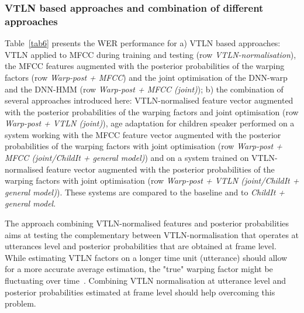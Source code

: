 \documentclass{nle}
\begin{document}
\subsubsection{VTLN based approaches and combination of different approaches}
Table~\ref{tab6} presents the WER performance for a) VTLN based approaches: VTLN applied to MFCC during training and testing (row {\em VTLN-normalisation}), the MFCC features augmented with the posterior probabilities of the warping factors (row {\em Warp-post + MFCC}) and the joint optimisation of the DNN-warp and the DNN-HMM (row {\em Warp-post + MFCC (joint)}); b) the combination of several approaches introduced here: VTLN-normalised feature vector augmented with the posterior probabilities of the warping factors and joint optimisation (row {\em Warp-post + VTLN (joint)}), age adaptation for children speaker performed on a system working with the MFCC feature vector augmented with the posterior probabilities of the warping factors with joint optimisation (row {\em Warp-post + MFCC (joint/ChildIt + general model)}) and on a system trained on VTLN-normalised feature vector augmented with the posterior probabilities of the warping factors with joint optimisation (row {\em Warp-post + VTLN (joint/ChildIt + general model)}). These systems are compared to the baseline and to {\em ChildIt + general model}. 

The approach combining VTLN-normalised features and posterior probabilities aims at testing the complementary between VTLN-normalisation that operates at utterances level and posterior probabilities that are obtained at frame level. While estimating VTLN factors on a longer time unit (utterance) should allow for a more accurate average estimation, the "true" warping factor might be fluctuating over time~\citep*{Miguel2005,MaragakisP08}. Combining VTLN normalisation at utterance level and posterior probabilities estimated at frame level should help overcoming this problem.
\end{document}

